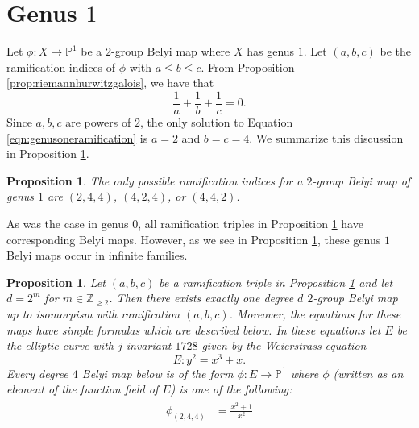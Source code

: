 \documentclass{dcthesis}
\newcommand{\PP}{\mathbb P}
\newcommand{\ZZ}{\mathbb Z}
\numberwithin{equation}{section}
\newtheorem{prop}[equation]{Proposition}
\theoremstyle{definition}
\theoremstyle{remark}
\begin{document}
{  \section{Genus $1$}{\label{sec:genusone}
    Let $\phi\colon X\to\PP^1$ be a $2$-group Belyi map
    where $X$ has genus $1$.
    Let $(a,b,c)$ be the ramification indices of $\phi$
    with $a\leq b\leq c$.
    From Proposition \ref{prop:riemannhurwitzgalois},
    we have that
    \begin{equation}\label{eqn:genusoneramification}
      \frac{1}{a}+\frac{1}{b}+\frac{1}{c} = 0.
    \end{equation}
    Since $a,b,c$ are powers of $2$,
    the only solution to
    Equation \ref{eqn:genusoneramification}
    is $a=2$ and $b=c=4$.
    We summarize this discussion in
    Proposition \ref{prop:genusoneramification}.
    \begin{prop}\label{prop:genusoneramification}
      The only possible ramification indices for
      a $2$-group Belyi map of genus $1$
      are $(2,4,4)$, $(4,2,4)$, or $(4,4,2)$.
    \end{prop}
    As was the case in genus $0$,
    all ramification triples in
    Proposition \ref{prop:genusoneramification}
    have corresponding Belyi maps.
    However, as we see in
    Proposition \ref{prop:genusonemaps},
    these genus $1$ Belyi maps occur in infinite families.
    \begin{prop}\label{prop:genusonemaps}
      Let $(a,b,c)$ be a ramification triple in
      Proposition \ref{prop:genusoneramification}
      and let $d = 2^m$ for $m\in\ZZ_{\geq 2}$.
      Then there exists exactly one
      degree $d$ $2$-group Belyi map up to isomorpism
      with ramification $(a,b,c)$.
      Moreover, the equations for these maps have simple formulas
      which are described below.
      In these equations let $E$ be the elliptic curve
      with $j$-invariant $1728$ given by the Weierstrass equation
      \[
        E\colon y^2 = x^3+x.
      \]
      Every degree $4$ Belyi map below is of the form
      $\phi\colon E\to\PP^1$ where $\phi$
      (written as an element of the function field of $E$)
      is one of the following:
      \begin{align}\label{eqn:d4g1}
        \begin{split}
          \phi_{(2,4,4)} &= \frac{x^2+1}{x^2}\\

\end{split}
\end{align}
\end{prop}}}
\end{document}
